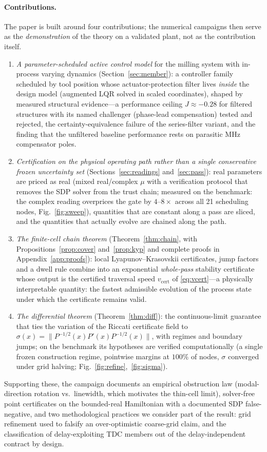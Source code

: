 \documentclass[preprint,12pt]{elsarticle}
\newcommand{\vcert}{v_{\mathrm{cert}}}
\begin{document}
\paragraph{Contributions.}  The paper is built around four
contributions; the numerical campaigns then serve as the
\emph{demonstration} of the theory on a validated plant, not as the
contribution itself.
\begin{enumerate}
\item \emph{A parameter-scheduled active control model} for the
milling system with in-process varying dynamics
(Section~\ref{sec:member}): a controller family scheduled by tool
position whose actuator-protection filter lives \emph{inside} the
design model (augmented LQR solved in scaled coordinates), shaped by
measured structural evidence---a performance ceiling
$J \approx -0.28$ for filtered structures with its named challenger
(phase-lead compensation) tested and rejected, the
certainty-equivalence failure of the series-filter variant, and the
finding that the unfiltered baseline performance rests on parasitic
MHz compensator poles.
\item \emph{Certification on the physical operating path rather than
a single conservative frozen uncertainty set}
(Sections~\ref{sec:readings} and~\ref{sec:pass}): real parameters are
priced as real (mixed real/complex $\mu$ with a verification protocol
that removes the SDP solver from the trust chain; measured on the
benchmark: the complex reading overprices the gate by $4$--$8\times$
across all 21 scheduling nodes, Fig.~\ref{fig:sweep}), quantities
that are constant along a pass are sliced, and the quantities that
actually evolve are chained along the path.
\item \emph{The finite-cell chain theorem}
(Theorem~\ref{thm:chain}, with Propositions~\ref{prop:cover}
and~\ref{prop:kyp} and complete proofs in
Appendix~\ref{app:proofs}): local Lyapunov--Krasovskii certificates,
jump factors and a dwell rule combine into an exponential
\emph{whole-pass} stability certificate whose output is the certified
traversal speed $\vcert$ of \eqref{eq:vcert}---a physically
interpretable quantity: the fastest admissible evolution of the
process state under which the certificate remains valid.
\item \emph{The differential theorem} (Theorem~\ref{thm:diff}): the
continuous-limit guarantee that ties the variation of the Riccati
certificate field to
$\sigma(x) = \|P^{-1/2}(x) P'(x) P^{-1/2}(x)\|$, with regimes and
boundary jumps; on the benchmark its hypotheses are verified
computationally (a single frozen construction regime, pointwise
margins at $100\%$ of nodes, $\sigma$ converged under grid halving;
Fig.~\ref{fig:refine},~\ref{fig:sigma}).
\end{enumerate}
Supporting these, the campaign documents an empirical obstruction law
(modal-direction rotation vs.\ linewidth, which motivates the
thin-cell limit), solver-free point certificates on the bounded-real
Hamiltonian with a documented SDP false-negative, and two
methodological practices we consider part of the result: grid
refinement used to falsify an over-optimistic coarse-grid claim, and
the classification of delay-exploiting TDC members out of the
delay-independent contract by design.
\end{document}
